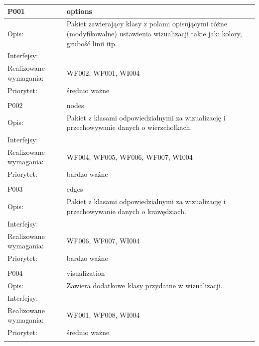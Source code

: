 \begin{center}
\begin{longtable}{|m{3cm}|m{9cm}|} \hline

P001 & options\\ \hline
Opis: & Pakiet zawierający klasy z polami opisującymi różne (modyfikowalne) ustawienia wizualizacji takie jak: kolory, grubość linii itp.     \\ \hline
Interfejsy: &     \\ \hline
Realizowane wymagania: & WF002, WF001, WI004 \\ \hline
Priorytet: & średnio ważne \\ \hline

\multicolumn{2}{c}{} \\
 \hline

P002 & nodes\\ \hline
Opis: & Pakiet z klasami odpowiedzialnymi za wizualizację i przechowywanie danych o wierzchołkach.    \\ \hline
Interfejsy: &     \\ \hline
Realizowane wymagania: & WF004, WF005, WF006, WF007, WI004 \\ \hline
Priorytet: & bardzo ważne \\ \hline

\multicolumn{2}{c}{} \\
 \hline

P003 & edges\\ \hline
Opis: & Pakiet z klasami odpowiedzialnymi za wizualizację i przechowywanie danych o krawędziach.    \\ \hline
Interfejsy: &     \\ \hline
Realizowane wymagania: & WF006, WF007, WI004 \\ \hline
Priorytet: & bardzo ważne \\ \hline

\multicolumn{2}{c}{} \\
 \hline

P004 & visualization\\ \hline
Opis: & Zawiera dodatkowe klasy przydatne w wizualizacji.\\ \hline
Interfejsy: &     \\ \hline
Realizowane wymagania: & WF001, WF008, WI004 \\ \hline
Priorytet: & średnio ważne \\ \hline

\multicolumn{2}{c}{} \\
 \hline


\end{longtable}
\end{center}
